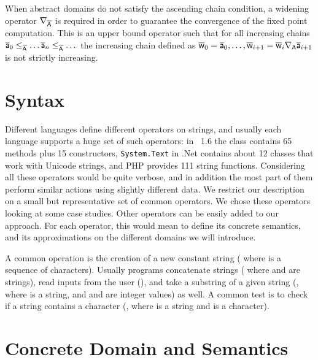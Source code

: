 \documentclass[orivec]{llncs}
\begin{document}
When abstract domains do not satisfy the ascending chain condition, a widening operator $\nabla_{\mathsf{\overline{A}}}$ is required in order to guarantee the convergence of the fixed point computation. This is an upper bound operator such that for all increasing chains $\mathsf{\overline{a}}_0 \leq_{\mathsf{\overline{A}}} \dots \mathsf{\overline{a}}_n \leq_{\mathsf{\overline{A}}} \dots$ the increasing chain defined as $\mathsf{\overline{w}}_0 = \mathsf{\overline{a}}_0, \dots , \mathsf{\overline{w}}_{i+1} = \mathsf{\overline{w}}_{i} \nabla_{\mathsf{A}} \mathsf{\overline{a}}_{i+1}$ is not strictly increasing.


\section{Syntax}
 
 

\label{sect:syntax}
Different languages define different operators on strings, and usually each language supports a huge set of such operators: in \Java\ 1.6 the  class contains 65 methods plus 15 constructors, \texttt{System.Text} in .Net contains about 12 classes that work with Unicode strings, and PHP provides 111 string functions. Considering all these operators would be quite verbose, and in addition the most part of them perform similar actions using slightly different data. We restrict our description on a small but representative set of common operators. We chose these operators looking at some case studies. Other operators can be easily added to our approach. For each operator, this would mean to define its concrete semantics, and its approximations on the different domains we will introduce.

A common operation is the creation of a new constant string ( where  is a sequence of characters). Usually programs concatenate strings ( where  and  are strings), read inputs from the user (), and take a substring of a given string (, where  is a string, and  and  are integer values) as well. A common test is to check if a string contains a character (, where  is a string and  is a character).



 
 
\section{Concrete Domain and Semantics}
\label{sect:concretedomain}
\end{document}
